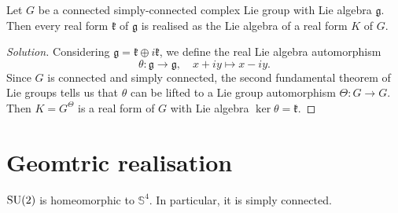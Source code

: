 \documentclass{report}
\begin{document}
\begin{exercise}[Exercise 3.15]
    Let $G$ be a connected simply-connected complex Lie group with Lie algebra $\mathfrak g$.
    Then every real form $\mathfrak k$ of $\mathfrak g$ is realised as the Lie algebra of a real form $K$ of $G$.
\end{exercise}
\begin{proof}[Solution]
    Considering $\mathfrak g = \mathfrak k \oplus i \mathfrak k$, we define the real Lie algebra automorphism
    \[
    \theta: \mathfrak g \to \mathfrak g, \quad x + iy \mapsto x - iy.
    \]
    Since $G$ is connected and simply connected, the second fundamental theorem of Lie groups tells us that $\theta$ can be lifted to a Lie group automorphism $\Theta: G \to G$.
    Then $K = G^\Theta$ is a real form of $G$ with Lie algebra $\ker \theta = \mathfrak k$.
\end{proof}

\chapter{Geomtric realisation}

\begin{proposition}
    $\operatorname{{\mathrm{SU}}}(2)$ is homeomorphic to $\mathbb S^4$.
    In particular, it is simply connected.
\end{proposition}

\printbibliography
\end{document}
